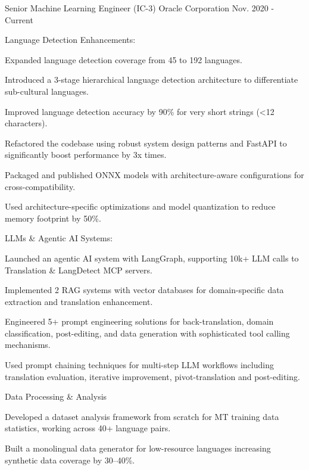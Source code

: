 \begin{cventries}
  \cvexperience
    {Senior Machine Learning Engineer (IC-3)}
    {Oracle Corporation}
    {}
    {}
    {Nov. 2020 - Current}
    {
      \begin{cvitemswithheading}
        {Language Detection Enhancements:}
        \item {Expanded language detection coverage from 45 to 192 languages.}
        \item {Introduced a 3-stage hierarchical language detection architecture to differentiate sub-cultural languages.}
        \item {Improved language detection accuracy by 90\% for very short strings (<12 characters).}
        \item {Refactored the codebase using robust system design patterns and FastAPI to significantly boost performance by 3x times.}
        \item {Packaged and published ONNX models with architecture-aware configurations for cross-compatibility.}
        \item {Used architecture-specific optimizations and model quantization to reduce memory footprint by 50\%.}
      \end{cvitemswithheading}
    }
  \cvexpproj
  {
    \begin{cvitemswithheading}
        {LLMs \& Agentic AI Systems:}
        \item {Launched an agentic AI system with LangGraph, supporting 10k+ LLM calls to Translation \& LangDetect MCP servers.}
        \item {Implemented 2 RAG systems with vector databases for domain-specific data extraction and translation enhancement.}
        \item {Engineered 5+ prompt engineering solutions for back-translation, domain classification, post-editing, and data generation with sophisticated tool calling mechanisms.}
        \item {Used prompt chaining techniques for multi-step LLM workflows including translation evaluation, iterative improvement, pivot-translation and post-editing.}
      \end{cvitemswithheading}
  }
  \cvexpproj
  {
    \begin{cvitemswithheading}
        {Data Processing \& Analysis}
         \item {Developed a dataset analysis framework from scratch for MT training data statistics, working across 40+ language pairs.}
        \item {Built a monolingual data generator for low-resource languages increasing synthetic data coverage by 30–40\%.}

\end{cvitemswithheading}}
\end{cventries}
